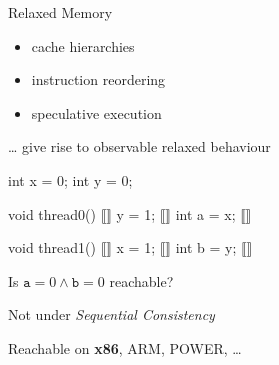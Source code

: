 \documentclass[aspectratio=169, fi]{paradise-slide}
\begin{document}
\begin{frame}[fragile]{Relaxed Memory}
  \begin{minipage}{0.47\textwidth}
    \begin{itemize}
      \item cache hierarchies
      \item instruction reordering
      \item speculative execution
    \end{itemize}

    … give rise to observable relaxed behaviour
  \end{minipage}
  \hfill\pause
  \begin{minipage}{0.48\textwidth}
    \begin{cppcode}
      int x = 0;
      int y = 0;
    \end{cppcode}
    \begin{minipage}{0.49\textwidth}
      \begin{cppcode}
        void thread0()
        { ⟦⟧
          y = 1; ⟦⟧
          int a = x; ⟦⟧
        }
      \end{cppcode}
    \end{minipage}
    \hfill
    \begin{minipage}{0.49\textwidth}
      \begin{cppcode}
        void thread1()
        { ⟦⟧
          x = 1; ⟦⟧
          int b = y; ⟦⟧
        }
      \end{cppcode}
    \end{minipage}

    \centering\medskip
    Is $\texttt{a} = 0 \land \texttt{b} = 0$ reachable?
  \end{minipage}

  \bigskip\bigskip\pause
  \begin{minipage}[t]{0.48\textwidth}
    Not under \emph{Sequential Consistency}

  \end{minipage}
  \hfill
  \begin{minipage}[t]{0.48\textwidth}
    Reachable on \textbf{x86}, ARM, POWER, …

  \end{minipage}
\end{frame}
\end{document}

